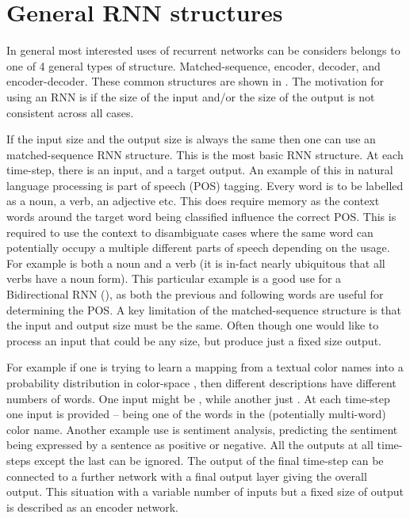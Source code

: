 \documentclass[12pt,parskip]{komatufte}
\begin{document}
\section{General RNN structures}
In general most interested uses of recurrent networks can be considers belongs to one of 4 general types of structure.
Matched-sequence, encoder, decoder, and encoder-decoder.
These common structures are shown in .
The motivation for using an RNN is if the size of the input and/or the size of the output is not consistent across all cases.

If the input size and the output size is always the same then one can use an matched-sequence RNN structure.
This is the most basic RNN structure.
At each time-step, there is an input, and a target output.
An example of this in natural language processing is part of speech (POS) tagging.
Every word is to be labelled as a noun, a verb, an adjective etc.
This does require memory as the context words around the target word being classified influence the correct POS.
This is required to use the context to disambiguate cases where the same word can potentially occupy a multiple different parts of speech depending on the usage.
For example  is both a noun and a verb (it is in-fact nearly ubiquitous that all verbs have a noun form).
This particular example is a good use for a Bidirectional RNN (), as both the previous and following words are useful for determining the POS.
A key limitation of the matched-sequence structure is that the input and output size must be the same.
Often though one would like to process an input that could be any size, but produce just a fixed size output.



For example if one is trying to learn a mapping from a textual color names into a probability distribution in color-space , then different descriptions have different numbers of words.
One input might be , while another just .
At each time-step one input is provided -- being one of the words in the (potentially multi-word) color name.
Another example use is sentiment analysis, predicting the sentiment being expressed by a sentence as positive or negative.
All the outputs at all time-steps except the last can be ignored.
The output of the final time-step can be connected to a further network with a final output layer giving the overall output.
This situation with a variable number of inputs but a fixed size of output is described as an encoder network.
\end{document}

